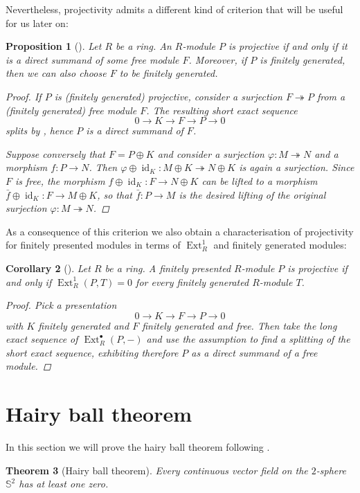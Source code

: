\documentclass[A4paper, 12pt, british, reqno]{amsart}
\newcommand{\bbS}{\mathbb{S}}
\theoremstyle{plain}
\newtheorem{thm}{Theorem}[section]
\newtheorem{prop}[thm]{Proposition}
\newtheorem{cor}[thm]{Corollary}
\theoremstyle{definition}
\theoremstyle{remark}
\theoremstyle{plain}
\theoremstyle{definition}
\theoremstyle{remark}
\theoremstyle{plain}
\theoremstyle{definition}
\theoremstyle{remark}
\DeclareMathOperator{\Ext}{Ext}
\DeclareMathOperator{\id}{id}
\newcommand{\op}{\oplus}
\begin{document}
Nevertheless, projectivity admits a different kind of criterion that will be useful for us later on:

\begin{prop}[{\cite[Lemma 1.1.2]{fra18}}]\label{prop:projective}
    Let $R$ be a ring.
    An $R$-module $P$ is projective if and only if it is a direct summand of some free module $F$.
    Moreover, if $P$ is finitely generated, then we can also choose $F$ to be finitely generated.
    \begin{proof}
	If $P$ is (finitely generated) projective, consider a surjection $F\twoheadrightarrow P$ from a (finitely generated) free module $F$.
	The resulting short exact sequence
	\[ 0 \to K\to F\to P \to 0 \]
	splits by , hence $P$ is a direct summand of $F$.

	Suppose conversely that $F=P\op K$ and consider a surjection $\varphi\colon M\twoheadrightarrow N$ and a morphism $f\colon P\to N$.
	Then $\varphi\op \id_{K} \colon M\op K\twoheadrightarrow N\op K$ is again a surjection.
	Since $F$ is free, the morphism $f\op \id_{K}\colon F\to N\op K$ can be lifted to a morphism $\bar{f}\op \id_{K}\colon F\to M\op K$, so that $\bar{f}\colon P\to M$ is the desired lifting of the original surjection $\varphi\colon M\twoheadrightarrow N$.
    \end{proof}
\end{prop}

{\color{gray}
As a consequence of this criterion we also obtain a characterisation of projectivity for finitely presented modules in terms of $\Ext^{1}_{R}$ and finitely generated modules:

\begin{cor}[{\cite[Cor.~1.1.28]{fra18}}]
    Let $R$ be a ring.
    A finitely presented $R$-module $P$ is projective if and only if $\Ext^{1}_{R}(P,T)=0$ for every finitely generated $R$-module $T$.
    \begin{proof}
	Pick a presentation
	\[ 0\to K\to F\to P\to 0 \]
	with $K$ finitely generated and $F$ finitely generated and free.
	Then take the long exact sequence of $\Ext^{\bullet}_{R}(P,-)$ and use the assumption to find a splitting of the short exact sequence, exhibiting therefore $P$ as a direct summand of a free module.
    \end{proof}
\end{cor}
}

\section{Hairy ball theorem}

In this section we will prove the hairy ball theorem following \cite{eg79}.

\begin{thm}[Hairy ball theorem]
    Every continuous vector field on the $2$-sphere $\bbS^{2}$ has at least one zero.
\end{thm}



\vfill
\end{document}
